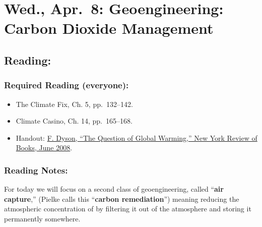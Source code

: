 \documentclass[
]{article}
\providecommand{\tightlist}{%
  \setlength{\itemsep}{0pt}\setlength{\parskip}{0pt}}
\newcommand{\COO}{\ce{CO2}}
\begin{document}
\hypertarget{wed.-apr.-8-geoengineering-carbon-dioxide-management}{%
\section{Wed., Apr.~8: Geoengineering: Carbon Dioxide
Management}\label{wed.-apr.-8-geoengineering-carbon-dioxide-management}}

\hypertarget{reading-36}{%
\subsection{Reading:}\label{reading-36}}

\hypertarget{required-reading-everyone-31}{%
\subsubsection{Required Reading
(everyone):}\label{required-reading-everyone-31}}

\begin{itemize}
\tightlist
\item
  The Climate Fix, Ch. 5, pp.~132--142.
\item
  Climate Casino, Ch. 14, pp.~165--168.
\item
  Handout:
  \href{/files/reading_handouts/Dyson-GlobalWarming-2008.pdf}{F. Dyson,
  ``The Question of Global Warming,'' New York Review of Books, June
  2008}.
\end{itemize}

\hypertarget{reading-notes-28}{%
\subsubsection{Reading Notes:}\label{reading-notes-28}}

For today we will focus on a second class of geoengineering, called
``\textbf{air capture},'' (Pielke calls this ``\textbf{carbon
remediation}'') meaning reducing the atmospheric concentration of \COO{}
by filtering it out of the atmosphere and storing it permanently
somewhere.
\end{document}
